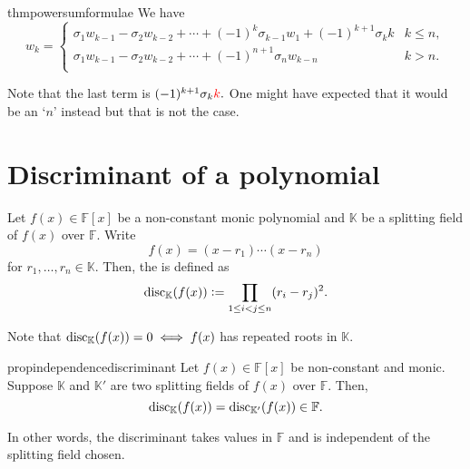 \begin{restatable}{thm}{powersumformulae}
\label{thm:powersumformulae}
    We have
    \begin{equation} \label{eq:newident}
        w_k = \begin{cases}
            \sigma_1 w_{k - 1} - \sigma_2w_{k - 2} + \cdots + (-1)^k \sigma_{k - 1}w_1 + (-1)^{k + 1}\sigma_k k & k \le n,\\
            \sigma_1 w_{k - 1} - \sigma_2w_{k - 2} + \cdots + (-1)^{n + 1} \sigma_{n}w_{k - n} & k > n.\\
                
        \end{cases}
    \end{equation} 
    \hfill\hyperref[thm:powersumformulae2]{\downsym}
\end{restatable}

Note that the last term is $(-1)^{k + 1} \sigma_k {\color{red}k}.$ One might have expected that it would be an `$n$' instead but that is not the case.

\section{Discriminant of a polynomial}

\begin{defn}%
    Let $f(x) \in \mathbb{F}[x]$ be a non-constant monic polynomial and $\mathbb{K}$ be a splitting field of $f(x)$ over $\mathbb{F}.$ Write
    \begin{equation*} 
        f(x) = (x - r_1) \cdots (x - r_n)
    \end{equation*}
    for $r_1, \ldots, r_n \in \mathbb{K}.$ Then, the  is defined as
    \begin{equation*} 
        \operatorname{disc}_{\mathbb{K}}(f(x)) \vcentcolon= \prod_{1 \le i < j \le n} (r_i - r_j)^2.
    \end{equation*}
\end{defn}

\begin{rem} \label{rem:discrepeatedroots}
    Note that $\operatorname{disc}_{\mathbb{K}}(f(x)) = 0 \iff f(x)$ has repeated roots in $\mathbb{K}.$
\end{rem}

\begin{restatable}[]{prop}{independencediscriminant}
\label{prop:independencediscriminant}
    Let $f(x) \in \mathbb{F}[x]$ be non-constant and monic. Suppose $\mathbb{K}$ and $\mathbb{K}'$ are two splitting fields of $f(x)$ over $\mathbb{F}.$ Then,
    \begin{equation*} 
        \operatorname{disc}_{\mathbb{K}}(f(x)) = \operatorname{disc}_{\mathbb{K}'}(f(x)) \in \mathbb{F}.
    \end{equation*} 

    In other words, the discriminant takes values in $\mathbb{F}$ and is independent of the splitting field chosen. \hfill\hyperref[prop:independencediscriminant2]{\downsym}
\end{restatable}

